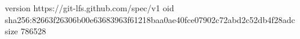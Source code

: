 version https://git-lfs.github.com/spec/v1
oid sha256:82663f26306b00e63683963f61218baa0ae40fce07902c72abd2c52db4f28adc
size 786528

